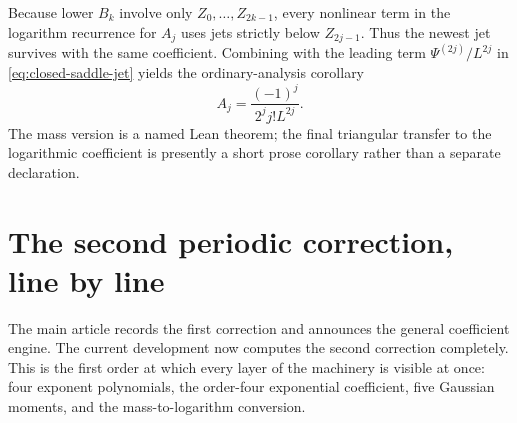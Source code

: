 \documentclass[11pt,oneside]{article}
\theoremstyle{definition}
\theoremstyle{remark}
\begin{document}
Because lower $B_k$ involve only $Z_0,\ldots,Z_{2k-1}$, every nonlinear term in the logarithm
recurrence for $A_j$ uses jets strictly below $Z_{2j-1}$.  Thus the newest jet survives with
the same coefficient.  Combining with the leading term
$\Psi^{(2j)}/L^{2j}$ in \eqref{eq:closed-saddle-jet} yields the ordinary-analysis
corollary
\begin{equation}
 [\Psi^{(2j)}]A_j
 =\frac{(-1)^j}{2^jj!L^{2j}}.
 \label{eq:top-periodic-derivative-coefficient}
\end{equation}
The mass version is a named Lean theorem; the final triangular transfer to the logarithmic
coefficient is presently a short prose corollary rather than a separate declaration.

\section{The second periodic correction, line by line}
\label{sec:second-correction}

The main article records the first correction and announces the general coefficient engine.
The current development now computes the second correction completely.  This is the first
order at which every layer of the machinery is visible at once: four exponent polynomials,
the order-four exponential coefficient, five Gaussian moments, and the mass-to-logarithm
conversion.
\end{document}
